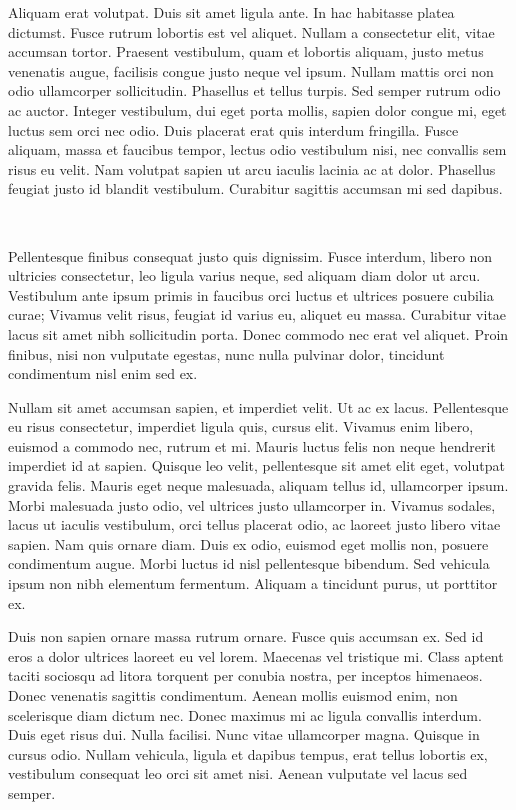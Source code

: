 \begin{refsection}
Aliquam erat volutpat. Duis sit amet ligula ante. In hac habitasse platea dictumst. Fusce rutrum lobortis est vel aliquet. Nullam a consectetur elit, vitae accumsan tortor. Praesent vestibulum, quam et lobortis aliquam, justo metus venenatis augue, facilisis congue justo neque vel ipsum. Nullam mattis orci non odio ullamcorper sollicitudin. Phasellus et tellus turpis. Sed semper rutrum odio ac auctor. Integer vestibulum, dui eget porta mollis, sapien dolor congue mi, eget luctus sem orci nec odio. Duis placerat erat quis interdum fringilla. Fusce aliquam, massa et faucibus tempor, lectus odio vestibulum nisi, nec convallis sem risus eu velit. Nam volutpat sapien ut arcu iaculis lacinia ac at dolor. Phasellus feugiat justo id blandit vestibulum. Curabitur sagittis accumsan mi sed dapibus.

\newpage
\begin{regBox}
\phantom{test}\\
\vspace{-15pt}

\begin{small}
Pellentesque finibus consequat justo quis dignissim. Fusce interdum, libero non ultricies consectetur, leo ligula varius neque, sed aliquam diam dolor ut arcu. Vestibulum ante ipsum primis in faucibus orci luctus et ultrices posuere cubilia curae; Vivamus velit risus, feugiat id varius eu, aliquet eu massa. Curabitur vitae lacus sit amet nibh sollicitudin porta. Donec commodo nec erat vel aliquet. Proin finibus, nisi non vulputate egestas, nunc nulla pulvinar dolor, tincidunt condimentum nisl enim sed ex.

Nullam sit amet accumsan sapien, et imperdiet velit. Ut ac ex lacus. Pellentesque eu risus consectetur, imperdiet ligula quis, cursus elit. Vivamus enim libero, euismod a commodo nec, rutrum et mi. Mauris luctus felis non neque hendrerit imperdiet id at sapien. Quisque leo velit, pellentesque sit amet elit eget, volutpat gravida felis. Mauris eget neque malesuada, aliquam tellus id, ullamcorper ipsum. Morbi malesuada justo odio, vel ultrices justo ullamcorper in. Vivamus sodales, lacus ut iaculis vestibulum, orci tellus placerat odio, ac laoreet justo libero vitae sapien. Nam quis ornare diam. Duis ex odio, euismod eget mollis non, posuere condimentum augue. Morbi luctus id nisl pellentesque bibendum. Sed vehicula ipsum non nibh elementum fermentum. Aliquam a tincidunt purus, ut porttitor ex.

Duis non sapien ornare massa rutrum ornare. Fusce quis accumsan ex. Sed id eros a dolor ultrices laoreet eu vel lorem. Maecenas vel tristique mi. Class aptent taciti sociosqu ad litora torquent per conubia nostra, per inceptos himenaeos. Donec venenatis sagittis condimentum. Aenean mollis euismod enim, non scelerisque diam dictum nec. Donec maximus mi ac ligula convallis interdum. Duis eget risus dui. Nulla facilisi. Nunc vitae ullamcorper magna. Quisque in cursus odio. Nullam vehicula, ligula et dapibus tempus, erat tellus lobortis ex, vestibulum consequat leo orci sit amet nisi. Aenean vulputate vel lacus sed semper.


\end{small}
\end{regBox}
\end{refsection}

